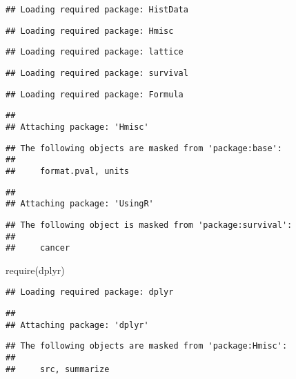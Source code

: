 \documentclass[
]{article}
\newenvironment{Shaded}{\begin{snugshade}}{\end{snugshade}}
\newcommand{\FunctionTok}[1]{\textcolor[rgb]{0.00,0.00,0.00}{#1}}
\newcommand{\NormalTok}[1]{#1}
\begin{document}
\begin{verbatim}
## Loading required package: HistData
\end{verbatim}

\begin{verbatim}
## Loading required package: Hmisc
\end{verbatim}

\begin{verbatim}
## Loading required package: lattice
\end{verbatim}

\begin{verbatim}
## Loading required package: survival
\end{verbatim}

\begin{verbatim}
## Loading required package: Formula
\end{verbatim}

\begin{verbatim}
## 
## Attaching package: 'Hmisc'
\end{verbatim}

\begin{verbatim}
## The following objects are masked from 'package:base':
## 
##     format.pval, units
\end{verbatim}

\begin{verbatim}
## 
## Attaching package: 'UsingR'
\end{verbatim}

\begin{verbatim}
## The following object is masked from 'package:survival':
## 
##     cancer
\end{verbatim}

\begin{Shaded}
\begin{Highlighting}[]
\FunctionTok{require}\NormalTok{(dplyr)}
\end{Highlighting}
\end{Shaded}

\begin{verbatim}
## Loading required package: dplyr
\end{verbatim}

\begin{verbatim}
## 
## Attaching package: 'dplyr'
\end{verbatim}

\begin{verbatim}
## The following objects are masked from 'package:Hmisc':
## 
##     src, summarize
\end{verbatim}
\end{document}

